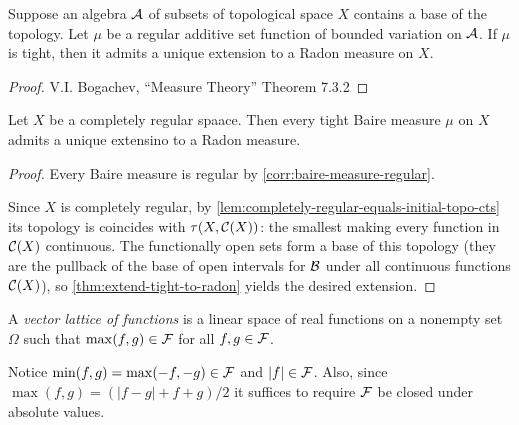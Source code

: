 
\begin{theorem}
  \label{thm:extend-tight-to-radon}
  Suppose an algebra $\mathcal{A}$ of subsets of topological space $X$
  contains a base of the topology.
  Let $\mu$ be a regular additive set function of bounded variation on $\mathcal{A}$.
  If $\mu$ is tight, then it admits a unique extension to a Radon measure on
  $X$.
\end{theorem}

\begin{proof}
  V.I. Bogachev, ``Measure Theory'' Theorem 7.3.2
\end{proof}


\begin{corollary}
  \label{corr:tight-baire-extend-radon}
  Let $X$ be a completely regular spaace.
  Then every tight Baire measure $\mu$ on $X$
  admits a unique extensino to a Radon measure.
\end{corollary}

\begin{proof}
  Every Baire measure is regular by \cref{corr:baire-measure-regular}.

  Since $X$ is completely regular,
  by \cref{lem:completely-regular-equals-initial-topo-cts}
  its topology is coincides with $\tau(X, \mathcal{C}(X))$: the smallest making every
  function in $\mathcal{C}(X)$ continuous.
  The functionally open sets form a base of this topology (they are the
  pullback of the base of open intervals for $\mathcal{B}$ under all continuous
  functions $\mathcal{C}(X)$), so
  \cref{thm:extend-tight-to-radon} yields the desired extension.
\end{proof}


\begin{definition}
  A \emph{vector lattice of functions} is a linear space of
  real functions on a nonempty set $\Omega$ such that
  $\max(f,g) \in \mathcal{F}$ for all $f,g \in \mathcal{F}$.
\end{definition}

\begin{remark}
  Notice $\min(f,g) = \max(-f,-g) \in \mathcal{F}$ and $\lvert f \rvert \in \mathcal{F}$.
  Also, since $\max(f,g) = (\lvert f - g \rvert + f + g) / 2$
  it suffices to require $\mathcal{F}$ be closed under absolute values.
\end{remark}

